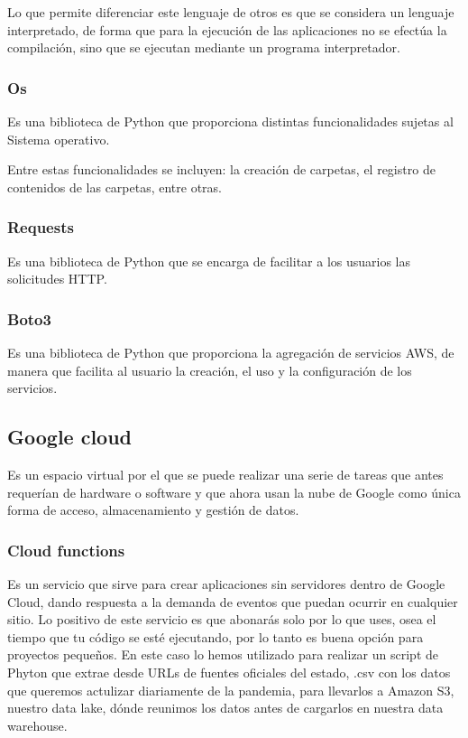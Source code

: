 Lo que permite diferenciar este lenguaje de otros es que se considera un lenguaje interpretado, de forma que para la ejecución de las aplicaciones no se efectúa la compilación, sino que se ejecutan mediante un programa interpretador.

\subsubsection{Os}
\cite{Os} Es una biblioteca de Python que proporciona distintas funcionalidades sujetas al Sistema operativo. 

Entre estas funcionalidades se incluyen: la creación de carpetas, el registro de contenidos de las carpetas, entre otras.

\subsubsection{Requests}
\cite{requests} Es una biblioteca de Python que se encarga de facilitar a los usuarios las solicitudes HTTP.

\subsubsection{Boto3}
\cite{Boto3} Es una biblioteca de Python que proporciona la agregación de servicios AWS, de manera que facilita al usuario la creación, el uso y la configuración de los servicios.

\subsection{Google cloud} \cite{google_cloud} Es un espacio virtual por el que se puede realizar una serie de tareas que antes requerían de hardware o software y que ahora usan la nube de Google como única forma de acceso, almacenamiento y gestión de datos.

\subsubsection{Cloud functions} \cite{cloud_functions} Es un servicio que sirve para crear aplicaciones sin servidores dentro de Google Cloud, dando respuesta a la demanda de eventos que puedan ocurrir en cualquier sitio. Lo positivo de este servicio es que abonarás solo por lo que uses, osea el tiempo que tu código se esté ejecutando, por lo tanto es buena opción para proyectos pequeños. En este caso lo hemos utilizado para realizar un script de Phyton \cite{Python} que extrae desde URLs de fuentes oficiales del estado, .csv con los datos que queremos actulizar diariamente de la pandemia, para llevarlos a Amazon S3, nuestro data lake, dónde reunimos los datos antes de cargarlos en nuestra data warehouse.
    	
